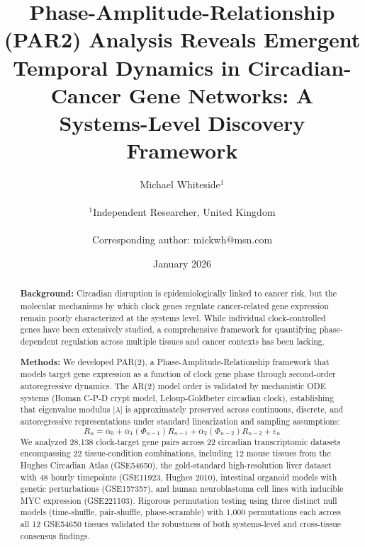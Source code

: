 \documentclass[11pt,a4paper]{article}
\title{\textbf{Phase-Amplitude-Relationship (PAR2) Analysis Reveals Emergent Temporal Dynamics in Circadian-Cancer Gene Networks: A Systems-Level Discovery Framework}}
\author{
Michael Whiteside$^{1}$ \\
\\
\small $^1$Independent Researcher, United Kingdom \\
\\
\small Corresponding author: mickwh@msn.com
}
\date{January 2026}
\begin{document}
\maketitle
\linenumbers

\begin{abstract}
\textbf{Background:} Circadian disruption is epidemiologically linked to cancer risk, but the molecular mechanisms by which clock genes regulate cancer-related gene expression remain poorly characterized at the systems level. While individual clock-controlled genes have been extensively studied, a comprehensive framework for quantifying phase-dependent regulation across multiple tissues and cancer contexts has been lacking.

\textbf{Methods:} We developed PAR(2), a Phase-Amplitude-Relationship framework that models target gene expression as a function of clock gene phase through second-order autoregressive dynamics. The AR(2) model order is validated by mechanistic ODE systems (Boman C-P-D crypt model, Leloup-Goldbeter circadian clock), establishing that eigenvalue modulus $|\lambda|$ is approximately preserved across continuous, discrete, and autoregressive representations under standard linearization and sampling assumptions:
\[R_n = \alpha_0 + \alpha_1(\Phi_{n-1})R_{n-1} + \alpha_2(\Phi_{n-2})R_{n-2} + \varepsilon_n\]
We analyzed 28,138 clock-target gene pairs across 22 circadian transcriptomic datasets encompassing 22 tissue-condition combinations, including 12 mouse tissues from the Hughes Circadian Atlas (GSE54650), the gold-standard high-resolution liver dataset with 48 hourly timepoints (GSE11923, Hughes 2010), intestinal organoid models with genetic perturbations (GSE157357), and human neuroblastoma cell lines with inducible MYC expression (GSE221103). Rigorous permutation testing using three distinct null models (time-shuffle, pair-shuffle, phase-scramble) with 1,000 permutations each across all 12 GSE54650 tissues validated the robustness of both systems-level and cross-tissue consensus findings.


\end{abstract}
\end{document}

